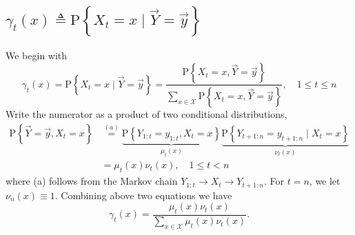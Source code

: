 \documentclass[11pt]{elegantbook}
\begin{document}
\subsection{$\gamma_t(x) \triangleq \mathrm{P}\left\{X_t=x \mid \vec{Y}=\vec{y}\right\}$}
We begin with
$$
\gamma_t(x)=\mathrm{P}\left\{X_t=x \mid \vec{Y}=\vec{y}\right\}=\frac{\mathrm{P}\left\{X_t=x, \vec{Y}=\vec{y}\right\}}{\sum_{x \in \mathcal{X}} \mathrm{P}\left\{X_t=x, \vec{Y}=\vec{y}\right\}}, \quad 1 \leq t \leq n
$$
Write the numerator as a product of two conditional distributions,
$$
\begin{aligned}
\mathrm{P}\left\{\vec{Y}=\vec{y}, X_t=x\right\} & \stackrel{(a)}{=} \underbrace{\mathrm{P}\left\{Y_{1: t}=y_{1: t}, X_t=x\right\}}_{\mu_t(x)} \underbrace{\mathrm{P}\left\{Y_{t+1: n}=y_{t+1: n} \mid X_t=x\right\}}_{\nu_t(x)} \\
&=\mu_t(x) \nu_t(x), \quad 1 \leq t<n
\end{aligned}
$$
where (a) follows from the Markov chain $Y_{1: t} \rightarrow X_t \rightarrow Y_{t+1: n}$. For $t=n$, we let $\nu_n(x) \equiv 1$. Combining above two equations we have
$$
\gamma_t(x)=\frac{\mu_t(x) \nu_t(x)}{\sum_{x \in \mathcal{X}} \mu_t(x) \nu_t(x)} .
$$
\end{document}
